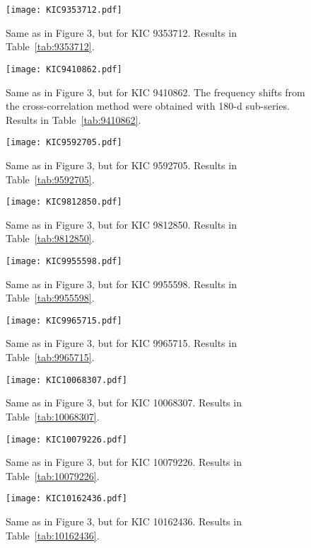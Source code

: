 \documentclass[twocolumn]{aastex61}%
\begin{document}
\begin{figure}[ht]
\texttt{[image: KIC9353712.pdf]}
\caption{Same as in Figure 3, but for KIC 9353712. Results in Table~\ref{tab:9353712}.}\label{fig:9353712}
\end{figure}

\begin{figure}[ht]
\texttt{[image: KIC9410862.pdf]}
\caption{Same as in Figure 3, but for KIC 9410862. The frequency shifts from the cross-correlation method were obtained with 180-d sub-series. Results in Table~\ref{tab:9410862}.}\label{fig:9410862}
\end{figure}

\begin{figure}[ht]
\texttt{[image: KIC9592705.pdf]}
\caption{Same as in Figure 3, but for KIC 9592705. Results in Table~\ref{tab:9592705}.}\label{fig:9592705}
\end{figure}

\begin{figure}[ht]
\texttt{[image: KIC9812850.pdf]}
\caption{Same as in Figure 3, but for KIC 9812850. Results in Table~\ref{tab:9812850}.}\label{fig:9812850}
\end{figure}

\begin{figure}[ht]
\texttt{[image: KIC9955598.pdf]}
\caption{Same as in Figure 3, but for KIC 9955598. Results in Table~\ref{tab:9955598}.}\label{fig:9955598}
\end{figure}

\begin{figure}[ht]
\texttt{[image: KIC9965715.pdf]}
\caption{Same as in Figure 3, but for KIC 9965715. Results in Table~\ref{tab:9965715}.}\label{fig:9965715}
\end{figure}

\begin{figure}[ht]
\texttt{[image: KIC10068307.pdf]}
\caption{Same as in Figure 3, but for KIC 10068307. Results in Table~\ref{tab:10068307}.}\label{fig:10068307}
\end{figure}

\begin{figure}[ht]
\texttt{[image: KIC10079226.pdf]}
\caption{Same as in Figure 3, but for KIC 10079226. Results in Table~\ref{tab:10079226}.}\label{fig:10079226}
\end{figure}

\begin{figure}[ht]
\texttt{[image: KIC10162436.pdf]}
\caption{Same as in Figure 3, but for KIC 10162436. Results in Table~\ref{tab:10162436}.}\label{fig:10162436}
\end{figure}
\end{document}
